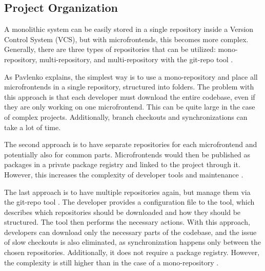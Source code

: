 \subsection{Project Organization}
A monolithic system can be easily stored in a single repository inside a Version Control System (VCS), but with microfrontends, this becomes more complex. Generally, there are three types of repositories that can be utilized: mono-repository, multi-repository, and multi-repository with the git-repo tool \cite{Pavlenko}.

As Pavlenko \cite{Pavlenko} explains, the simplest way is to use a mono-repository and place all microfrontends in a single repository, structured into folders. The problem with this approach is that each developer must download the entire codebase, even if they are only working on one microfrontend. This can be quite large in the case of complex projects. Additionally, branch checkouts and synchronizations can take a lot of time.

The second approach is to have separate repositories for each microfrontend and potentially also for common parts. Microfrontends would then be published as packages in a private package registry and linked to the project through it. However, this increases the complexity of developer tools and maintenance \cite{Pavlenko}.

The last approach is to have multiple repositories again, but manage them via the git-repo tool \cite{GitRepo}. The developer provides a configuration file to the tool, which describes which repositories should be downloaded and how they should be structured. The tool then performs the necessary actions. With this approach, developers can download only the necessary parts of the codebase, and the issue of slow checkouts is also eliminated, as synchronization happens only between the chosen repositories. Additionally, it does not require a package registry. However, the complexity is still higher than in the case of a mono-repository \cite{Pavlenko}.